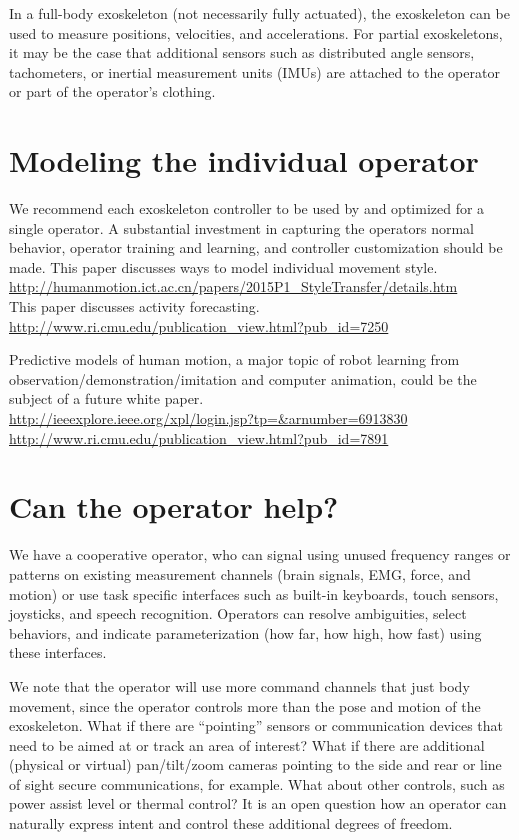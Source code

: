 \documentclass[letterpaper,12pt,fullpage]{article}
\begin{document}
In a full-body exoskeleton
(not necessarily fully actuated), the
exoskeleton can be used to measure positions, velocities,
and accelerations. For partial exoskeletons,
it may be the case that additional sensors such as distributed 
angle sensors, tachometers, or inertial measurement units (IMUs)
are attached to the operator or part of the operator's clothing.

\section{Modeling the individual operator}

We recommend each exoskeleton controller
to be used by and optimized for a single operator.
A substantial investment in capturing the operators normal behavior,
operator training and learning, and controller customization should be made.
This paper discusses ways to model individual movement style.\\
\url{http://humanmotion.ict.ac.cn/papers/2015P1_StyleTransfer/details.htm}\\
This paper discusses activity forecasting.\\
\url{http://www.ri.cmu.edu/publication_view.html?pub_id=7250}

Predictive models of human motion, a major topic of robot learning from\\
observation/demonstration/imitation and computer animation,
could be the subject of a future white
paper.\\
\url{http://ieeexplore.ieee.org/xpl/login.jsp?tp=&arnumber=6913830}\\
\url{http://www.ri.cmu.edu/publication_view.html?pub_id=7891}

\section{Can the operator help?}

We have a cooperative operator, who can signal using unused frequency
ranges or patterns on existing measurement
channels (brain signals, EMG, force, and motion) or use 
task specific interfaces such as built-in keyboards, touch sensors, joysticks,
and speech recognition.
Operators can resolve ambiguities, select behaviors, and indicate
parameterization (how far, how high, how fast) using these interfaces.

We note that the operator will use more command channels that just
body movement, since
the operator controls more than the pose and motion of the
exoskeleton. What if there are ``pointing'' sensors or communication
devices that need to be aimed at or track an area of interest? What if
there are additional (physical or virtual) pan/tilt/zoom cameras
pointing to the side and rear or line of sight secure communications,
for example. What about other controls, such as power assist level or
thermal control? It is an open question
how an operator can naturally express intent and
control these additional degrees of freedom.
\end{document}
